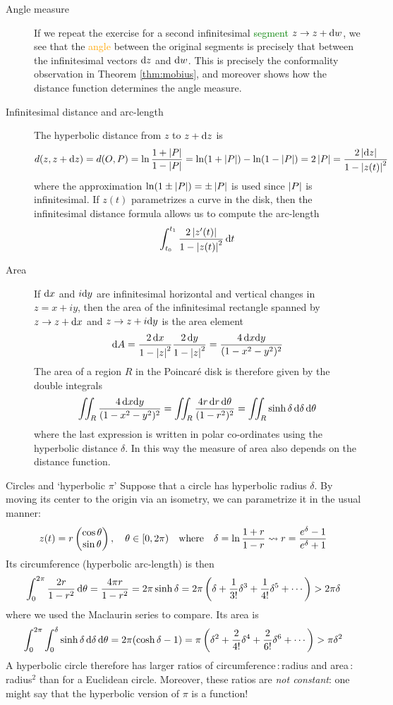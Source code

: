 \begin{description}
	\item[Angle measure]\label{pg:hypareaext} If we repeat the exercise for a second infinitesimal \textcolor{Green}{segment} $z\to z+{\mathrm{d} w}$, we see that the \textcolor{orange}{angle} between the original segments is precisely that between the infinitesimal vectors ${\mathrm{d} z}$ and ${\mathrm{d} w}$. This is precisely the conformality observation in Theorem \ref{thm:mobius}, and moreover shows how the distance function determines the angle measure.
	\item[Infinitesimal distance and arc-length] The hyperbolic distance from $z$ to $z+{\mathrm{d} z}$ is
	\[
		d(z,z+{\mathrm{d} z})=d(O,P)=\ln\frac{1+\left| P\right|}{1-\left| P\right|} =\ln(1+\left| P\right|)-\ln(1-\left| P\right|)=2\left| P\right|=\frac{2\left| {\mathrm{d} z}\right|}{1-\left| z(t)\right|^2}
	\]
	where the approximation $\ln(1\pm\left| P\right|)=\pm\left| P\right|$ is used since $\left| P\right|$ is infinitesimal.\smallbreak
	If $z(t)$ parametrizes a curve in the disk, then the infinitesimal distance formula allows us to compute the arc-length
	\[
		\int_{t_0}^{t_1}\frac{2\left| z'(t)\right|}{1-\left| z(t)\right|^2}\,{\mathrm{d} t}
	\]
	\item[Area] If ${\mathrm{d} x}$ and $i{\mathrm{d} y}$ are infinitesimal horizontal and vertical changes in $z=x+iy$, then the area of the infinitesimal rectangle spanned by $z\to z+{\mathrm{d} x}$ and $z\to z+i{\mathrm{d} y}$ is the area element
	\[
		{\mathrm{d} A}=\frac{2\,{\mathrm{d} x}}{1-\left| z\right|^2}\frac{2\,{\mathrm{d} y}}{1-\left| z\right|^2} =\frac{4\,{\mathrm{d} x}{\mathrm{d} y}}{(1-x^2-y^2)^2}
	\]
	The area of a region $R$ in the Poincaré disk is therefore given by the double integrals
	\[
		\iint_R\frac{4\,{\mathrm{d} x}{\mathrm{d} y}}{(1-x^2-y^2)^2}=\iint_R\frac{4r\,{\mathrm{d} r}\,{\mathrm{d}\theta}}{(1-r^2)^2} =\iint_R\sinh\delta\,\mathrm{d}\delta\,{\mathrm{d}\theta}
	\]
	where the last expression is written in polar co-ordinates using the hyperbolic distance $\delta$. In this way the measure of area also depends on the distance function.
\end{description}

\begin{example}{Circles and `hyperbolic $\pi$'}{}
	Suppose that a circle has hyperbolic radius $\delta$. By moving its center to the origin via an isometry, we can parametrize it in the usual manner:
	\[
		z(t)=r\begin{pmatrix}\cos\theta\\\sin\theta\end{pmatrix},\quad \theta\in[0,2\pi)
		\quad\text{where}\quad 
		\delta=\ln\frac{1+r}{1-r}\rightsquigarrow r=\frac{e^\delta-1}{e^\delta+1}
	\]
	Its circumference (hyperbolic arc-length) is then
	\[
		\int_0^{2\pi}\frac{2 r}{1-r^2}\,{\mathrm{d}\theta} =\frac{4\pi r}{1-r^2} =2\pi\sinh\delta =2\pi\left(\delta+\frac{1}{3!}\delta^3+\frac{1}{4!}\delta^5+\cdots\right)>2\pi\delta
	\]
	where we used the Maclaurin series to compare. Its area is
	\[
		\int_0^{2\pi}\int_0^\delta\sinh\delta\,\mathrm{d}\delta\,{\mathrm{d}\theta} =2\pi(\cosh\delta-1) =\pi\left(\delta^2+\frac{2}{4!}\delta^4+\frac{2}{6!}\delta^6+\cdots\right)>\pi\delta^2
		\]
	A hyperbolic circle therefore has larger ratios of circumference\,:\,radius and area\,:\,radius${}^2$ than for a Euclidean circle. Moreover, these ratios are \emph{not constant}: one might say that the hyperbolic version of $\pi$ is a function!
\end{example}


